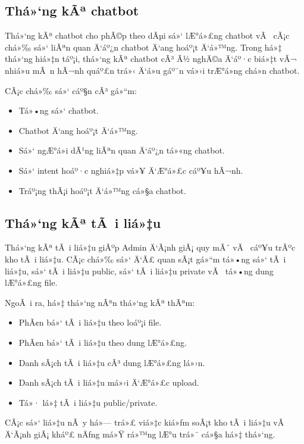 ﻿\documentclass[12pt,a4paper]{report}
\begin{document}
\subsection{Thá»‘ng kÃª chatbot}

Thá»‘ng kÃª chatbot cho phÃ©p theo dÃµi sá»‘ lÆ°á»£ng chatbot vÃ  cÃ¡c chá»‰ sá»‘ liÃªn quan Ä‘áº¿n chatbot Ä‘ang hoáº¡t Ä‘á»™ng. Trong há»‡ thá»‘ng hiá»‡n táº¡i, thá»‘ng kÃª chatbot cÃ³ Ã½ nghÄ©a Ä‘áº·c biá»‡t vÃ¬ nhiá»u mÃ n hÃ¬nh quáº£n trá»‹ Ä‘á»u gáº¯n vá»›i trÆ°á»ng chá»n chatbot.

CÃ¡c chá»‰ sá»‘ cáº§n cÃ³ gá»“m:

\begin{itemize}
    \item Tá»•ng sá»‘ chatbot.
    \item Chatbot Ä‘ang hoáº¡t Ä‘á»™ng.
    \item Sá»‘ ngÆ°á»i dÃ¹ng liÃªn quan Ä‘áº¿n tá»«ng chatbot.
    \item Sá»‘ intent hoáº·c nghiá»‡p vá»¥ Ä‘Æ°á»£c cáº¥u hÃ¬nh.
    \item Tráº¡ng thÃ¡i hoáº¡t Ä‘á»™ng cá»§a chatbot.
\end{itemize}

\subsection{Thá»‘ng kÃª tÃ i liá»‡u}

Thá»‘ng kÃª tÃ i liá»‡u giÃºp Admin Ä‘Ã¡nh giÃ¡ quy mÃ´ vÃ  cáº¥u trÃºc kho tÃ i liá»‡u. CÃ¡c chá»‰ sá»‘ Ä‘Ã£ quan sÃ¡t gá»“m tá»•ng sá»‘ tÃ i liá»‡u, sá»‘ tÃ i liá»‡u public, sá»‘ tÃ i liá»‡u private vÃ  tá»•ng dung lÆ°á»£ng file.

NgoÃ i ra, há»‡ thá»‘ng nÃªn thá»‘ng kÃª thÃªm:

\begin{itemize}
    \item PhÃ¢n bá»‘ tÃ i liá»‡u theo loáº¡i file.
    \item PhÃ¢n bá»‘ tÃ i liá»‡u theo dung lÆ°á»£ng.
    \item Danh sÃ¡ch tÃ i liá»‡u cÃ³ dung lÆ°á»£ng lá»›n.
    \item Danh sÃ¡ch tÃ i liá»‡u má»›i Ä‘Æ°á»£c upload.
    \item Tá»· lá»‡ tÃ i liá»‡u public/private.
\end{itemize}

CÃ¡c sá»‘ liá»‡u nÃ y há»— trá»£ viá»‡c kiá»ƒm soÃ¡t kho tÃ i liá»‡u vÃ  Ä‘Ã¡nh giÃ¡ kháº£ nÄƒng má»Ÿ rá»™ng lÆ°u trá»¯ cá»§a há»‡ thá»‘ng.
\end{document}
